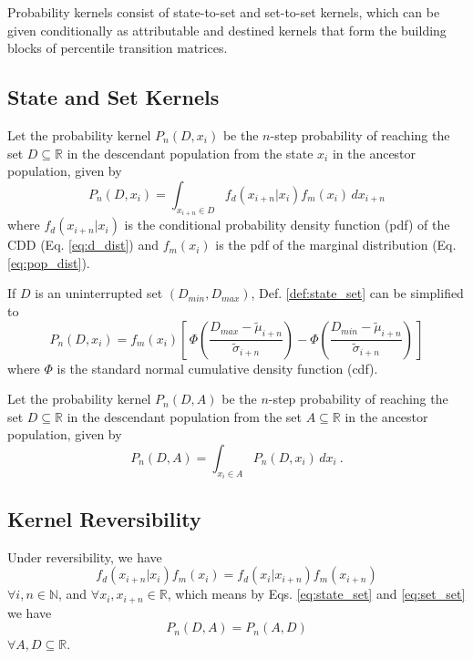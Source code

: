 \documentclass{svproc} %
\begin{document}
Probability kernels consist of state-to-set and set-to-set kernels, which can be given conditionally as attributable and destined kernels that form the building blocks of percentile transition matrices. 

\subsection{State and Set Kernels}

\begin{definition}
Let the probability kernel $P_n(D, x_i)$ be the $n$-step probability of reaching the set $D \subseteq \mathbb{R}$ in the descendant population from the state $x_i$ in the ancestor population, given by
\begin{equation}
P_n(D, x_i) = \int_{x_{i+n}\in D}^{} f_d(x_{i+n}|x_i)f_m(x_i) \, dx_{i+n} 
\label{eq:state_set}
\end{equation}
where $f_d(x_{i+n}|x_i)$ is the conditional probability density function (pdf) of the CDD (Eq. \ref{eq:d_dist}) and $f_m(x_i)$ is the pdf of the marginal distribution (Eq. \ref{eq:pop_dist}).
\label{def:state_set}
\end{definition}

If $D$ is an uninterrupted set $(D_{min}, D_{max})$, Def. \ref{def:state_set} can be simplified to
\begin{equation}
P_n(D, x_i) = f_m(x_i)[\, \Phi(\frac{D_{max}- \tilde{\mu}_{i+n}}{\tilde{\sigma}_{i+n}}) - \Phi(\frac{D_{min}- \tilde{\mu}_{i+n}}{\tilde{\sigma}_{i+n}}) \, ]
\end{equation}
where $\Phi$ is the standard normal cumulative density function (cdf). 


\begin{definition}
Let the probability kernel $P_n(D, A)$ be the $n$-step probability of reaching the set $D \subseteq \mathbb{R}$ in the descendant population from the set $A \subseteq \mathbb{R}$ in the ancestor population, given by
\begin{equation}
P_n(D, A) = \int_{x_i\in A}^{} P_n(D, x_i) \, dx_i \ .
\label{eq:set_set}
\end{equation}
\label{def:set_set}
\end{definition}



\subsection{Kernel Reversibility}

Under reversibility, we have 
\begin{equation}
f_d(x_{i+n}|x_i)f_m(x_i) = f_d(x_i|x_{i+n})f_m(x_{i+n}) 
\end{equation}
$\forall i, n \in \mathbb{N}$, and $\forall x_{i}, x_{i+n} \in \mathbb{R}$, which means by Eqs. \ref{eq:state_set} and \ref{eq:set_set} we have 
\begin{equation}
P_n(D, A) = P_n(A, D) 
\label{eq:set_set_eq}
\end{equation}
$\forall A, D \subseteq \mathbb{R}$.
\end{document}
